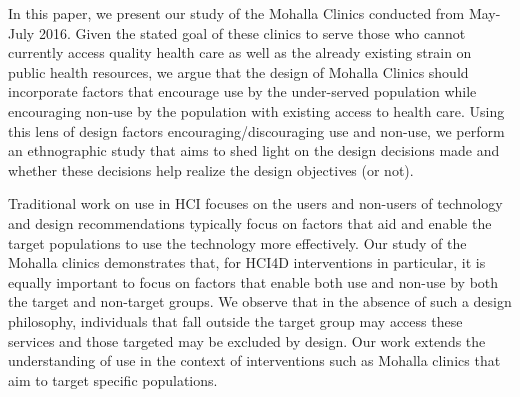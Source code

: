 In this paper, we present our study of the Mohalla Clinics conducted from May-July 2016. Given the stated goal of these clinics to serve those who cannot currently access quality health care as well as the already existing strain on public health resources, we argue that the design of Mohalla Clinics should incorporate factors that encourage use by the under-served population while encouraging non-use by the population with existing access to health care. Using this lens of design factors encouraging/discouraging use and non-use, we perform an ethnographic study that aims to shed light on the design decisions made and whether these decisions help realize the design objectives (or not). 

Traditional work on use in HCI focuses on the users and non-users of technology and design recommendations typically focus on factors that aid and enable the target populations to use the technology more effectively. Our study of the Mohalla clinics demonstrates that, for HCI4D interventions in particular, it is equally important to focus on factors that enable both use and non-use by both the target and non-target groups. %
We observe that in the absence of such a design philosophy, individuals that fall outside the target group may access these services and those targeted may be excluded by design. Our work extends the understanding of use in the context of interventions such as Mohalla clinics that aim to target specific populations.
\begin{comment} 
In this paper, we present our study of the Mohalla Clinics conducted from May-July 2016. Our use of ethnographic methods aims to shed light on the design objectives of this initiative and how these were realized (or not). By discussing the findings from our observations and interviews, we draw attention to the target users of this initiative and the use that resulted from this intervention, highlighting the challenges of (designing such programs).
While traditional work on use in HCI focuses on the users and non-users of technology and design recommendations follow initial assumptions regarding these groups \cite{?}, our study of the Mohalla clinics demonstrates that the distinction between use and non-use can be unclear. Individuals that fall outside the target group may access these services \cite{baumer2015usees} and those targeted may be excluded by design. Our paper draws upon the existing body of literature to extend the understanding of use in the context of interventions such as Mohalla clinics that aim to target specific populations.
\end{comment}